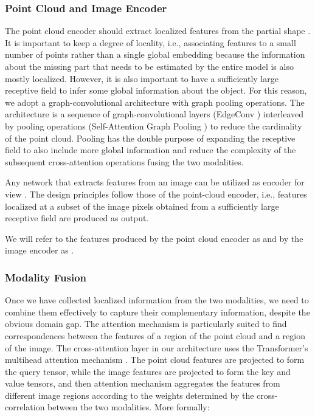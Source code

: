\documentclass{article}
\begin{document}
\subsubsection{Point Cloud and Image Encoder}
The point cloud encoder should extract localized features from the partial shape . It is important to keep a degree of locality, i.e., associating features to a small number of points  rather than a single global embedding because the information about the missing part that needs to be estimated by the entire model is also mostly localized. However, it is also important to have a sufficiently large receptive field to infer some global information about the object. For this reason, we adopt a graph-convolutional architecture with graph pooling operations. The architecture is a sequence of graph-convolutional layers (EdgeConv \cite{dgcnn}) interleaved by pooling operations (Self-Attention Graph Pooling \cite{sag-pool}) to reduce the cardinality of the point cloud. Pooling has the double purpose of expanding the receptive field to also include more global information and reduce the complexity of the subsequent cross-attention operations fusing the two modalities.  


Any network that extracts features from an image can be utilized as encoder for view . The design principles follow those of the point-cloud encoder, i.e., features localized at a subset  of the image pixels obtained from a sufficiently large receptive field are produced as output.

We will refer to the features produced by the point cloud encoder as  and by the image encoder as .


\subsubsection{Modality Fusion}
Once we have collected localized information from the two modalities, we need to combine them effectively to capture their complementary information, despite the obvious domain gap. The attention mechanism is particularly suited to find correspondences between the features of a region of the point cloud and a region of the image. The cross-attention layer in our architecture uses the Transformer's multihead attention mechanism \cite{attention}. The point cloud features are projected to form the query tensor, while the image features are projected to form the key and value tensors, and then attention mechanism aggregates the features from different image regions according to the weights determined by the cross-correlation between the two modalities. More formally:
\end{document}
